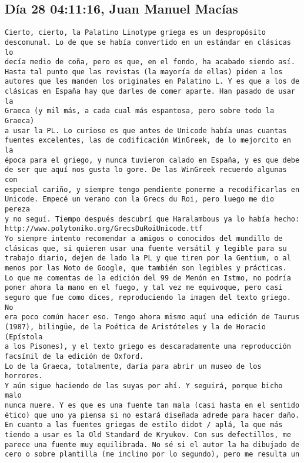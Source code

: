 \documentclass[a4paper,10pt]{article}
\begin{document}
\subsection{Día 28 04:11:16, Juan Manuel Macías}

\begin{lstlisting}
Cierto, cierto, la Palatino Linotype griega es un despropósito
descomunal. Lo de que se había convertido en un estándar en clásicas lo
decía medio de coña, pero es que, en el fondo, ha acabado siendo así.
Hasta tal punto que las revistas (la mayoría de ellas) piden a los
autores que les manden los originales en Palatino L. Y es que a los de
clásicas en España hay que darles de comer aparte. Han pasado de usar la
Graeca (y mil más, a cada cual más espantosa, pero sobre todo la Graeca)
a usar la PL. Lo curioso es que antes de Unicode había unas cuantas
fuentes excelentes, las de codificación WinGreek, de lo mejorcito en la
época para el griego, y nunca tuvieron calado en España, y es que debe
de ser que aquí nos gusta lo gore. De las WinGreek recuerdo algunas con
especial cariño, y siempre tengo pendiente ponerme a recodificarlas en
Unicode. Empecé un verano con la Grecs du Roi, pero luego me dio pereza
y no seguí. Tiempo después descubrí que Haralambous ya lo había hecho: 
http://www.polytoniko.org/GrecsDuRoiUnicode.ttf
Yo siempre intento recomendar a amigos o conocidos del mundillo de
clásicas que, si quieren usar una fuente versátil y legible para su
trabajo diario, dejen de lado la PL y que tiren por la Gentium, o al
menos por las Noto de Google, que también son legibles y prácticas.
Lo que me comentas de la edición del 99 de Menón en Istmo, no podría
poner ahora la mano en el fuego, y tal vez me equivoque, pero casi
seguro que fue como dices, reproduciendo la imagen del texto griego. No
era poco común hacer eso. Tengo ahora mismo aquí una edición de Taurus
(1987), bilingüe, de la Poética de Aristóteles y la de Horacio (Epístola
a los Pisones), y el texto griego es descaradamente una reproducción
facsímil de la edición de Oxford.
Lo de la Graeca, totalmente, daría para abrir un museo de los horrores.
Y aún sigue haciendo de las suyas por ahí. Y seguirá, porque bicho malo
nunca muere. Y es que es una fuente tan mala (casi hasta en el sentido
ético) que uno ya piensa si no estará diseñada adrede para hacer daño.
En cuanto a las fuentes griegas de estilo didot / aplá, la que más
tiendo a usar es la Old Standard de Kryukov. Con sus defectillos, me
parece una fuente muy equilibrada. No sé si el autor la ha dibujado de
cero o sobre plantilla (me inclino por lo segundo), pero me resulta un

\end{lstlisting}
\end{document}
